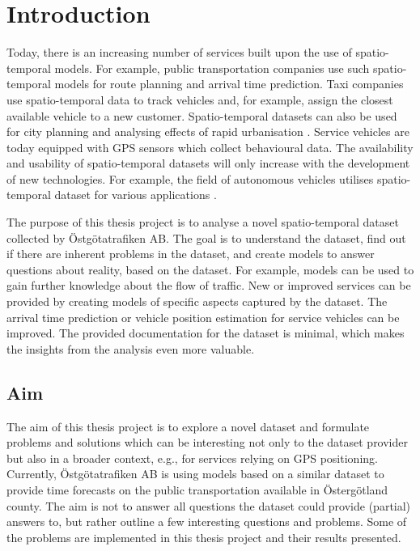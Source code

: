 \chapter{Introduction}
\label{cha:introduction}

Today, there is an increasing number of services built upon the use of spatio-temporal models.
For example, public transportation companies use such spatio-temporal models for route planning and arrival time prediction.
Taxi companies use spatio-temporal data to track vehicles and, for example, assign the closest available vehicle to a new customer.
Spatio-temporal datasets can also be used for city planning and analysing effects of rapid urbanisation \cite{Deng2009, Liu2005}.
Service vehicles are today equipped with GPS sensors which collect behavioural data.
The availability and usability of spatio-temporal datasets will only increase with the development of new technologies.
For example, the field of autonomous vehicles utilises spatio-temporal dataset for various applications \cite{Dickmanns1990, Peng2018}.

The purpose of this thesis project is to analyse a novel spatio-temporal dataset collected by Östgötatrafiken AB.
The goal is to understand the dataset, find out if there are inherent problems in the dataset, and create models to answer questions about reality, based on the dataset.
For example, models can be used to gain further knowledge about the flow of traffic.
New or improved services can be provided by creating models of specific aspects captured by the dataset.
The arrival time prediction or vehicle position estimation for service vehicles can be improved.
The provided documentation for the dataset is minimal, which makes the insights from the analysis even more valuable.

\section{Aim}
\label{sec:aim}
The aim of this thesis project is to explore a novel dataset and formulate problems and solutions which can be interesting not only to the dataset provider but also in a broader context, e.g., for services relying on GPS positioning.
Currently, Östgötatrafiken AB is using models based on a similar dataset to provide time forecasts on the public transportation available in Östergötland county.
The aim is not to answer all questions the dataset could provide (partial) answers to, but rather outline a few interesting questions and problems.
Some of the problems are implemented in this thesis project and their results presented.

